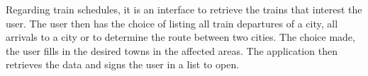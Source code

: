 
Regarding train schedules, it is an interface to retrieve the trains that interest the user. The user then has the choice of listing all train departures of a city, all arrivals to a city or to determine the route between two cities. The choice made, the user fills in the desired towns in the affected areas. The application then retrieves the data and signs the user in a list to open.

